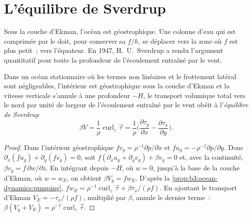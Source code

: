 \section{L'équilibre de Sverdrup}\label{sec:b3:ocean-dynamics:sverdrup}

Sous la couche d'Ekman, l'océan est géostrophique. Une colonne d'eau qui est
comprimée par le  doit, pour conserver sa  $f/h$,
se déplacer vers la zone où $f$ est plus petit~: vers l'équateur. En 1947, H.~U.~Sverdrup
a rendu l'argument quantitatif pour toute la profondeur de l'écoulement entraîné par le vent.

\begin{theorem}\label{thm:b3:ocean-dynamics:sverdrup}
Dans un océan stationnaire où les termes non linéaires et le frottement latéral
sont négligeables, l'intérieur est géostrophique sous la couche d'Ekman et la
vitesse verticale s'annule à une profondeur $-H$, le transport volumique total vers le nord
par unité de largeur de l'écoulement entraîné par le vent obéit à l'\emph{équilibre
de Sverdrup}
\[
\beta V = \frac{1}{\rho}\operatorname{curl}_z\vec\tau
= \frac{1}{\rho}\Big(\frac{\partial\tau_y}{\partial x} -
\frac{\partial\tau_x}{\partial y}\Big) .
\]
\end{theorem}

\begin{proof}
Dans l'intérieur géostrophique $fv_g = \rho^{-1}\partial p/\partial x$ et
$fu_g = -\rho^{-1}\partial p/\partial y$. Donc $\partial_x(fu_g) +
\partial_y(fv_g) = 0$, soit $f(\partial_xu_g + \partial_yv_g) + \beta
v_g = 0$ et, avec la continuité, $\beta v_g = f\,\partial w/\partial z$.
En intégrant depuis $-H$, où $w = 0$, jusqu'à la base de la couche d'Ekman,
où $w = w_E$, on obtient $\beta V_g = fw_E$. D'après
la \cref{prop:b3:ocean-dynamics:pumping}, $fw_E = \rho^{-1}\operatorname{curl}_z
\vec\tau + \beta\tau_x/(\rho f)$. En ajoutant le transport d'Ekman $V_E =
-\tau_x/(\rho f)$, multiplié par $\beta$, annule le dernier terme~:
$\beta(V_g + V_E) = \rho^{-1}\operatorname{curl}_z\vec\tau$.
\end{proof}

